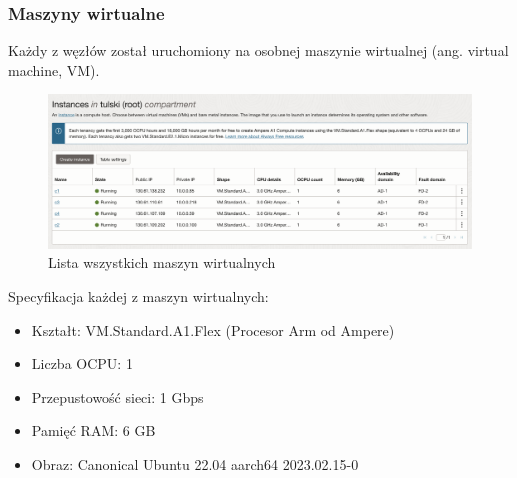 \subsubsection{Maszyny wirtualne}

Każdy z węzłów został uruchomiony na osobnej maszynie wirtualnej (ang. virtual machine, VM).


\begin{figure}[H]
    \centering
    \includegraphics[width=\textwidth]{img/oci-compute-instances}
    \caption{Lista wszystkich maszyn wirtualnych}
    \label{fig:oci-compute-instances}
\end{figure}

Specyfikacja każdej z maszyn wirtualnych:
\begin{itemize}
    \item Kształt: VM.Standard.A1.Flex (Procesor Arm od Ampere)
    \item Liczba OCPU: 1
    \item Przepustowość sieci: 1 Gbps
    \item Pamięć RAM: 6 GB
    \item Obraz: Canonical Ubuntu 22.04 aarch64 2023.02.15-0
\end{itemize}

